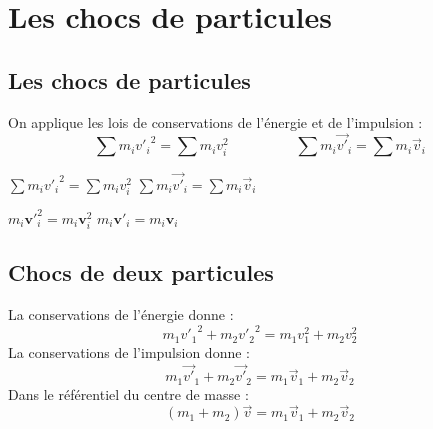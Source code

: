 %
\section{Les chocs de particules}
%
\subsection{Les chocs de particules}
On applique les lois de conservations de l'énergie et de l'impulsion :
\[
\sum m_i{v'_i}^2=\sum m_iv_i^2
\hspace{2cm}
\sum m_i\overrightarrow{v'}_i=\sum m_i\overrightarrow{v}_i
\]
\begin{center}
$\sum m_i{v'_i}^2=\sum m_iv_i^2$
\hspace{2cm}
$\sum m_i\overrightarrow{v'}_i=\sum m_i\overrightarrow{v}_i$
\end{center}
\begin{center}
$m_i\mathbf{v'}_i^2=m_i\mathbf{v}_i^2$
\hspace{2cm}
$m_i\mathbf{v'}_i=m_i\mathbf{v}_i$
\end{center}
%
\subsection{Chocs de deux particules}
La conservations de l'énergie donne :
\[
m_1{v'_1}^2 + m_2{v'_2}^2=m_1v_1^2 + m_2v_2^2
\]
La conservations de l'impulsion donne :
\[
m_1\overrightarrow{v'}_1 + m_2\overrightarrow{v'}_2=m_1\overrightarrow{v}_1 + m_2\overrightarrow{v}_2
\]
Dans le référentiel du centre de masse : 
\[
(m_1 + m_2)\overrightarrow{v}=m_1\overrightarrow{v}_1 + m_2\overrightarrow{v}_2
\]
%

